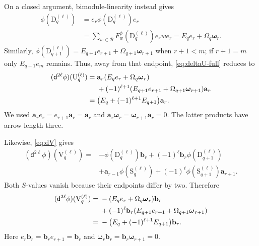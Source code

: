 \documentclass[a4paper,11pt,oneside,reqno]{amsart}
\theoremstyle{definition}
\numberwithin{equation}{section}
\begin{document}
	On a closed argument, bimodule-linearity instead gives
	\begin{equation}\label{eq:parallel-D-calculation}
		\begin{aligned}
			\phi(\mathrm{D}_q^{(\ell)})
			&=e_r\phi(\mathrm{D}_q^{(\ell)})e_r\\
			&=\sum_{w\in\mathcal B}F_w^\phi(\mathrm{D}_q^{(\ell)})e_rwe_r
			=E_qe_r+\Omega_q\boldsymbol{\omega}_r.
		\end{aligned}
	\end{equation}
	Similarly,
	$\phi(\mathrm{D}_{q+1}^{(\ell)})=E_{q+1}e_{r+1}+\Omega_{q+1}\boldsymbol{\omega}_{r+1}$
	when $r+1<m$; if $r+1=m$ only $E_{q+1}e_m$ remains.
	Thus, away from that endpoint, \eqref{eq:deltaU-full} reduces to
	\begin{align}
		(\mathsf d^{2\ell}\phi)(\mathrm{U}_q^{(\ell)})
		={}&\mathbf{a}_r(E_qe_r+\Omega_q\boldsymbol{\omega}_r)\notag\\
		&+(-1)^{\ell+1}(E_{q+1}e_{r+1}+\Omega_{q+1}\boldsymbol{\omega}_{r+1})\mathbf{a}_r\notag\\
		={}&\bigl(E_q+(-1)^{\ell+1}E_{q+1}\bigr)\mathbf{a}_r.
		\label{eq:deltaU-collected}
	\end{align}
	We used $\mathbf{a}_r e_r=e_{r+1}\mathbf{a}_r=\mathbf{a}_r$ and
	$\mathbf{a}_r\boldsymbol{\omega}_r=\boldsymbol{\omega}_{r+1}\mathbf{a}_r=0$.  The latter products have arrow length three.
	
	Likewise, \eqref{eq:dV} gives
	\begin{equation}\label{eq:deltaV-full}
		\begin{aligned}
			(\mathsf d^{2\ell}\phi)(\mathrm{V}_q^{(\ell)})
			={}&-\phi(\mathrm{D}_q^{(\ell)})\mathbf{b}_r
			+(-1)^\ell \mathbf{b}_r\phi(\mathrm{D}_{q+1}^{(\ell)})\\
			&+\mathbf{a}_{r-1}\phi(\mathrm{S}_q^{(\ell)})
			+(-1)^\ell\phi(\mathrm{S}_{q+1}^{(\ell)})\mathbf{a}_{r+1}.
		\end{aligned}
	\end{equation}
	Both $S$-values vanish because their endpoints differ by two.  Therefore
	\begin{align}
		(\mathsf d^{2\ell}\phi)(\mathrm{V}_q^{(\ell)})
		={}&-(E_qe_r+\Omega_q\boldsymbol{\omega}_r)\mathbf{b}_r\notag\\
		&+(-1)^\ell \mathbf{b}_r(E_{q+1}e_{r+1}+\Omega_{q+1}\boldsymbol{\omega}_{r+1})\notag\\
		={}&-\bigl(E_q+(-1)^{\ell+1}E_{q+1}\bigr)\mathbf{b}_r.
		\label{eq:deltaV-collected}
	\end{align}
	Here $e_r\mathbf{b}_r=\mathbf{b}_r e_{r+1}=\mathbf{b}_r$ and $\boldsymbol{\omega}_r\mathbf{b}_r=\mathbf{b}_r\boldsymbol{\omega}_{r+1}=0$.
	
\end{document}
